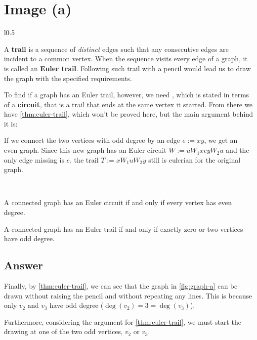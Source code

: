 \section{Image (a)}

\begin{wrapfigure}{l}{0.5\textwidth}
    \centering
    

    \caption{Image \texttt{a.} from question with labelled nodes.}
    \label{fig:graph-a}
\end{wrapfigure}

A \textbf{trail} is a sequence of \textit{distinct} edges such that any consecutive edges are incident to a common vertex. When the sequence visits every edge of a graph, it is called an \textbf{Euler trail}. Following such trail with a pencil would lead us to draw the graph with the specified requirements.

To find if a graph has an Euler trail, however, we need , which is stated in terms of a \textbf{circuit}, that is a trail that ends at the same vertex it started. From there we have \cref{thm:euler-trail}, which won't be proved here, but the main argument behind it is:

If we connect the two vertices with odd degree by an edge $e := x y$, we get an even graph. Since this new graph has an Euler circuit $W := u W_1 x e y W_2 u$ and the only edge missing is $e$, the trail $T := x W_1 u W_2 y$ still is eulerian for the original graph.

~

\begin{theorem} \label{thm:euler-circuit}
    A connected graph has an Euler circuit if and only if every vertex has even degree.
\end{theorem}

\begin{proposition} \label{thm:euler-trail}
    A connected graph has an Euler trail if and only if exactly zero or two vertices have odd degree.
\end{proposition}

\subsection{Answer}

    Finally, by \cref{thm:euler-trail}, we can see that the graph in \cref{fig:graph-a} can be drawn without raising the pencil and without repeating any lines. This is because only $v_2$ and $v_3$ have odd degree ($\deg(v_2) = 3 = \deg(v_3)$).

    Furthermore, considering the argument for \cref{thm:euler-trail}, we must start the drawing at one of the two odd vertices, $v_2$ or $v_3$.

~
